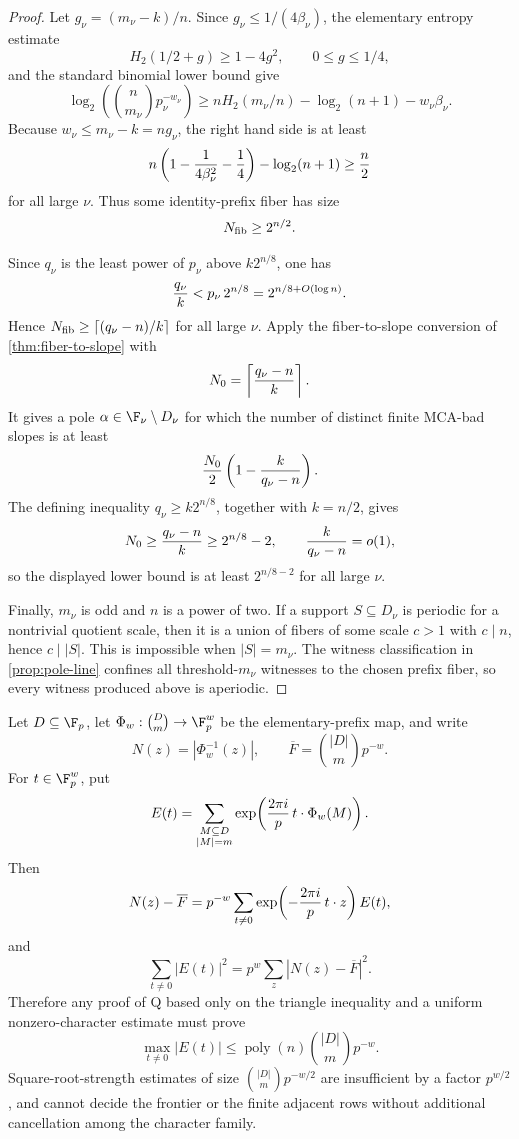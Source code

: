 \begin{proof}
Let \(g_\nu=(m_\nu-k)/n\).  Since \(g_\nu\le 1/(4\beta_\nu)\), the elementary
entropy estimate
\[
        H_2(1/2+g)\ge 1-4g^2,\qquad 0\le g\le 1/4,
\]
and the standard binomial lower bound give
\[
        \log_2\left(\binom n{m_\nu}p_\nu^{-w_\nu}\right)
        \ge
        nH_2(m_\nu/n)-\log_2(n+1)-w_\nu\beta_\nu .
\]
Because \(w_\nu\le m_\nu-k=ng_\nu\), the right hand side is at least
\[
        n\left(1-{1\over4\beta_\nu^2}-{1\over4}\right)-\log_2(n+1)
        \ge {n\over2}
\]
for all large \(\nu\).  Thus some identity-prefix fiber has size
\[
        N_{\rm fib}\ge 2^{n/2}.
\]

Since \(q_\nu\) is the least power of \(p_\nu\) above \(k2^{n/8}\), one has
\[
        {q_\nu\over k}<p_\nu\,2^{n/8}=2^{n/8+O(\log n)}.
\]
Hence \(N_{\rm fib}\ge \lceil(q_\nu-n)/k\rceil\) for all large \(\nu\).
Apply the fiber-to-slope conversion of \cref{thm:fiber-to-slope} with
\[
        N_0=\left\lceil{q_\nu-n\over k}\right\rceil.
\]
It gives a pole \(\alpha\in\F_\nu\setminus D_\nu\) for which the number of
distinct finite MCA-bad slopes is at least
\[
        {N_0\over2}\left(1-{k\over q_\nu-n}\right).
\]
The defining inequality \(q_\nu\ge k2^{n/8}\), together with \(k=n/2\), gives
\[
        N_0\ge {q_\nu-n\over k}\ge 2^{n/8}-2,
        \qquad
        {k\over q_\nu-n}=o(1),
\]
so the displayed lower bound is at least \(2^{n/8-2}\) for all large \(\nu\).

Finally, \(m_\nu\) is odd and \(n\) is a power of two.  If a support
\(S\subseteq D_\nu\) is periodic for a nontrivial quotient scale, then it is a
union of fibers of some scale \(c>1\) with \(c\mid n\), hence \(c\mid |S|\).
This is impossible when \(|S|=m_\nu\).  The witness classification in
\cref{prop:pole-line} confines all threshold-\(m_\nu\) witnesses to the chosen
prefix fiber, so every witness produced above is aperiodic.
\end{proof}

\begin{proposition}
\label{prop:q-fourier-audit}
Let \(D\subseteq\F_p\), let \(\Phi_w:\binom{D}{m}\to\F_p^w\) be the
elementary-prefix map, and write
\[
        N(z)=|\Phi_w^{-1}(z)|,\qquad
        \overline F=\binom{|D|}{m}p^{-w}.
\]
For \(t\in\F_p^w\), put
\[
        E(t)=\sum_{\substack{M\subseteq D\\ |M|=m}}
        \exp\!\left({2\pi i\over p}\,t\cdot\Phi_w(M)\right).
\]
Then
\[
        N(z)-\overline F
        =
        p^{-w}\sum_{t\ne0}
        \exp\!\left(-{2\pi i\over p}\,t\cdot z\right)E(t),
\]
and
\[
        \sum_{t\ne0}|E(t)|^2
        =
        p^w\sum_z |N(z)-\overline F|^2 .
\]
Therefore any proof of Q based only on the triangle inequality and a uniform
nonzero-character estimate must prove
\[
        \max_{t\ne0}|E(t)|
        \le
        \operatorname{poly}(n)\binom{|D|}{m}p^{-w}.
\]
Square-root-strength estimates of size
\(\binom{|D|}{m}p^{-w/2}\) are insufficient by a factor \(p^{w/2}\), and
cannot decide the frontier or the finite adjacent rows without additional
cancellation among the character family.
\end{proposition}

